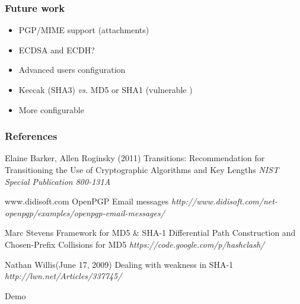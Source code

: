 \documentclass{beamer}
\begin{document}

\begin{frame}[fragile] %
\frametitle{Future work}
\begin{itemize}
\item PGP/MIME support (attachments)
\item ECDSA and ECDH?
\item Advanced users configuration
\item Keccak (SHA3) \emph{vs.} MD5 or SHA1 (vulnerable \cite{sh})
\item More configurable
\end{itemize}
\end{frame}


\begin{frame}
\frametitle{References}
\footnotesize{
\begin{thebibliography}{99} 

 Elaine Barker, Allen Roginsky (2011)
\newblock Transitions: Recommendation for Transitioning the Use of Cryptographic Algorithms and Key Lengths
\newblock \emph{NIST Special Publication 800-131A}

 www.didisoft.com
\newblock OpenPGP Email messages
\newblock \emph{http://www.didisoft.com/net-openpgp/examples/openpgp-email-messages/}

 Marc Stevens
\newblock Framework for MD5 \& SHA-1 Differential Path Construction and Chosen-Prefix Collisions for MD5
\newblock \emph{https://code.google.com/p/hashclash/}

 Nathan Willis(June 17, 2009)
\newblock Dealing with weakness in SHA-1
\newblock \emph{http://lwn.net/Articles/337745/}

\end{thebibliography}
}
\end{frame}


\begin{frame}
\Huge{\centerline{Demo}}
\end{frame}

\end{document}
